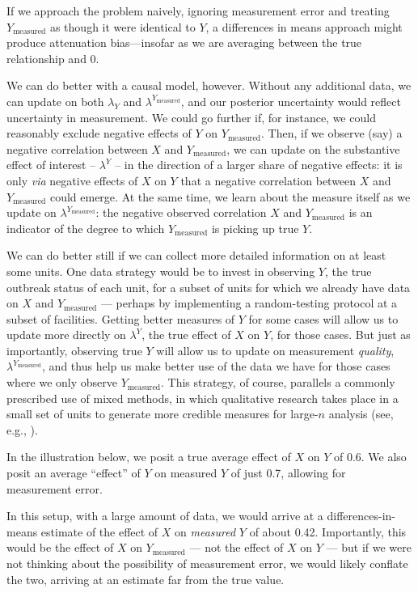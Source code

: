 \documentclass[
  12pt,
]{book}
\begin{document}
If we approach the problem naively, ignoring measurement error and treating \(Y_\text{measured}\) as though it were identical to \(Y\), a differences in means approach might produce attenuation bias---insofar as we are averaging between the true relationship and 0.

We can do better with a causal model, however. Without any additional data, we can update on both \(\lambda_Y\) and \(\lambda^{Y_\text{measured}}\), and our posterior uncertainty would reflect uncertainty in measurement. We could go further if, for instance, we could reasonably exclude negative effects of \(Y\) on \(Y_\text{measured}\). Then, if we observe (say) a negative correlation between \(X\) and \(Y_\text{measured}\), we can update on the substantive effect of interest -- \(\lambda^Y\) -- in the direction of a larger share of negative effects: it is only \emph{via} negative effects of \(X\) on \(Y\) that a negative correlation between \(X\) and \(Y_\text{measured}\) could emerge. At the same time, we learn about the measure itself as we update on \(\lambda^{Y_\text{measured}}\): the negative observed correlation \(X\) and \(Y_\text{measured}\) is an indicator of the degree to which \(Y_\text{measured}\) is picking up true \(Y\).

We can do better still if we can collect more detailed information on at least some units. One data strategy would be to invest in observing \(Y\), the true outbreak status of each unit, for a subset of units for which we already have data on \(X\) and \(Y_\text{measured}\) --- perhaps by implementing a random-testing protocol at a subset of facilities. Getting better measures of \(Y\) for some cases will allow us to update more directly on \(\lambda^Y\), the true effect of \(X\) on \(Y\), for those cases. But just as importantly, observing true \(Y\) will allow us to update on measurement \emph{quality}, \(\lambda^{Y_\text{measured}}\), and thus help us make better use of the data we have for those cases where we only observe \(Y_\text{measured}\). This strategy, of course, parallels a commonly prescribed use of mixed methods, in which qualitative research takes place in a small set of units to generate more credible measures for large-\(n\) analysis (see, e.g., \citet{seawrightbook}).

In the illustration below, we posit a true average effect of \(X\) on \(Y\) of 0.6. We also posit an average ``effect'' of \(Y\) on measured \(Y\) of just 0.7, allowing for measurement error.

In this setup, with a large amount of data, we would arrive at a differences-in-means estimate of the effect of \(X\) on \emph{measured} \(Y\) of about 0.42. Importantly, this would be the effect of \(X\) on \(Y_{\text{measured}}\) --- not the effect of \(X\) on \(Y\) --- but if we were not thinking about the possibility of measurement error, we would likely conflate the two, arriving at an estimate far from the true value.
\end{document}
